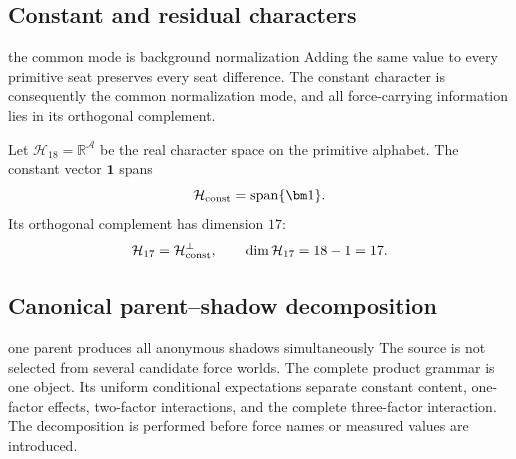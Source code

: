 \documentclass[11pt]{article}
\numberwithin{equation}{section}
\theoremstyle{remark}
\newcommand{\R}{\mathbb{R}}
\begin{document}
\label{sec:carrier}

\subsection{Constant and residual characters}
\begin{interpretivebridge}{the common mode is background normalization}
Adding the same value to every primitive seat preserves every seat difference. The constant character is consequently the common normalization mode, and all force-carrying information lies in its orthogonal complement.
\end{interpretivebridge}

Let $\mathcal H_{18}=\R^{\mathcal A}$ be the real character space on the primitive alphabet. The constant vector $\bm 1$ spans
\begin{equation}
\mathcal H_{\rm const}=\operatorname{span}\{\bm1\}.
\end{equation}
Its orthogonal complement has dimension $17$:
\begin{equation}
\mathcal H_{17}=\mathcal H_{\rm const}^{\perp},\qquad
\dim\mathcal H_{17}=18-1=17.
\end{equation}

\subsection{Canonical parent--shadow decomposition}
\begin{interpretivebridge}{one parent produces all anonymous shadows simultaneously}
The source is not selected from several candidate force worlds. The complete product grammar is one object. Its uniform conditional expectations separate constant content, one-factor effects, two-factor interactions, and the complete three-factor interaction. The decomposition is performed before force names or measured values are introduced.
\end{interpretivebridge}
\end{document}
